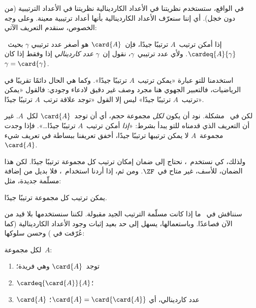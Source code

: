 \documentclass[../../../include/open-logic-section]{subfiles}
\begin{document}

في الواقع، ستستخدم نظريتنا في الأعداد الكاردينالية نظريتنا في الأعداد
الترتيبية (من دون خجل). أي إننا سنعرّف الأعداد الكاردينالية بأنها
أعداد ترتيبية معينة. وعلى وجه الخصوص، سنقدم التعريف الآتي:

\begin{defn}
إذا أمكن ترتيب~$A$ ترتيبًا جيدًا، فإن~$\card{A}$ هو أصغر عدد ترتيبي
$\gamma$ بحيث~$\cardeq{A}{\gamma}$. ولأي عدد ترتيبي~$\gamma$، نقول
إن~$\gamma$ \emph{عدد كاردينالي} إذا وفقط إذا كان
$\gamma = \card{\gamma}$.
\end{defn}

استخدمنا للتو عبارة «يمكن ترتيب~$A$ ترتيبًا جيدًا». وكما هي الحال
دائمًا تقريبًا في الرياضيات، فالتعبير الجهوي هنا مجرد وصف غير دقيق
لادعاء وجودي: فالقول «يمكن ترتيب~$A$ ترتيبًا جيدًا» ليس إلا القول
«توجد علاقة ترتب~$A$ ترتيبًا جيدًا».

لكن في~ مشكلة. نود أن يكون \emph{لكل}
مجموعة حجم، أي أن توجد~$\card{A}$ لكل~$A$. غير أن التعريف الذي
قدمناه للتو يبدأ بشرط: «\emph{إذا} أمكن ترتيب~$A$ ترتيبًا
جيدًا\ldots». فإذا وجدت مجموعة~$A$ لا يمكن ترتيبها ترتيبًا جيدًا،
أخفق تعريفنا ببساطة في تعريف شيء~$\card{A}$.

ولذلك، كي نستخدم~، نحتاج إلى ضمان إمكان
ترتيب كل مجموعة ترتيبًا جيدًا. لكن هذا الضمان، للأسف، غير متاح
في~$\ZF$. ومن ثم، إذا أردنا استخدام~، فلا
بديل من إضافة مسلّمة جديدة، مثل:
\begin{axiom}
يمكن ترتيب كل مجموعة ترتيبًا جيدًا.
\end{axiom}
سنناقش في~ ما إذا كانت مسلّمة الترتيب الجيد
مقبولة. لكننا سنستخدمها بلا قيد من الآن فصاعدًا. وباستعمالها، يسهل
إلى حد بعيد إثبات وجود الأعداد الكاردينالية (كما عُرّفت في
) وحسن سلوكها:

\begin{lem}
لكل مجموعة~$A$:
\begin{enumerate}
	\item{} توجد~$\card{A}$ وهي فريدة؛
	\item{} $\cardeq{\card{A}}{A}$؛
	\item{} $\card{A}$ عدد كاردينالي، أي
	$\card{A} = \card{\card{A}}$؛
\end{enumerate}
\end{lem}
\end{document}

